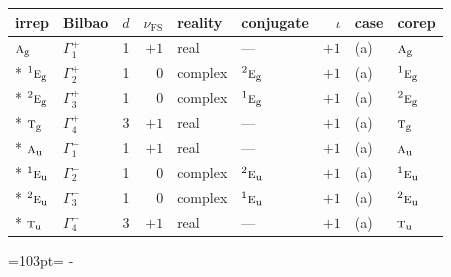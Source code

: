 \documentclass[10pt,a4paper]{article}
\newcommand{\needspace}[1]{\par\penalty-100\begingroup\dimen0=#1\relax\dimen2=\pagegoal
  \advance\dimen2-\pagetotal\ifdim\dimen0>\dimen2\relax\ifdim\dimen2>0pt\vfil\break\fi\fi
  \endgroup}
\numberwithin{equation}{section}
\newcommand{\irr}[1]{\text{\normalfont\scshape #1}}
\newcommand{\conjpair}[1]{{}^{#1}}
\newcommand{\ptag}[1]{\mathrm{#1}}
\newcommand{\fsind}{\nu_{\mathrm{FS}}}
\begin{document}
{\small\renewcommand{\arraystretch}{1.25}\setlength{\tabcolsep}{4pt}\begin{longtable}{@{}llrrllrll@{}}\toprule
irrep & Bilbao & $d$ & $\fsind$ & reality & conjugate & $\iota$ & case & corep\\\midrule\endhead
\bottomrule\endfoot\endlastfoot
$\irr{a}_{\ptag{g}}$ & $\Gamma_{1}^{+}$ & 1 & $+1$ & real & --- & $+1$ & (a) & $\irr{a}_{\ptag{g}}$\\*
$\conjpair{1}\irr{e}_{\ptag{g}}$ & $\Gamma_{2}^{+}$ & 1 & $0$ & complex & $\conjpair{2}\irr{e}_{\ptag{g}}$ & $+1$ & (a) & $\conjpair{1}\irr{e}_{\ptag{g}}$\\*
$\conjpair{2}\irr{e}_{\ptag{g}}$ & $\Gamma_{3}^{+}$ & 1 & $0$ & complex & $\conjpair{1}\irr{e}_{\ptag{g}}$ & $+1$ & (a) & $\conjpair{2}\irr{e}_{\ptag{g}}$\\*
$\irr{t}_{\ptag{g}}$ & $\Gamma_{4}^{+}$ & 3 & $+1$ & real & --- & $+1$ & (a) & $\irr{t}_{\ptag{g}}$\\*
$\irr{a}_{\ptag{u}}$ & $\Gamma_{1}^{-}$ & 1 & $+1$ & real & --- & $+1$ & (a) & $\irr{a}_{\ptag{u}}$\\*
$\conjpair{1}\irr{e}_{\ptag{u}}$ & $\Gamma_{2}^{-}$ & 1 & $0$ & complex & $\conjpair{2}\irr{e}_{\ptag{u}}$ & $+1$ & (a) & $\conjpair{1}\irr{e}_{\ptag{u}}$\\*
$\conjpair{2}\irr{e}_{\ptag{u}}$ & $\Gamma_{3}^{-}$ & 1 & $0$ & complex & $\conjpair{1}\irr{e}_{\ptag{u}}$ & $+1$ & (a) & $\conjpair{2}\irr{e}_{\ptag{u}}$\\*
$\irr{t}_{\ptag{u}}$ & $\Gamma_{4}^{-}$ & 3 & $+1$ & real & --- & $+1$ & (a) & $\irr{t}_{\ptag{u}}$\\
\bottomrule\end{longtable}}
\needspace{103pt}
\end{document}
